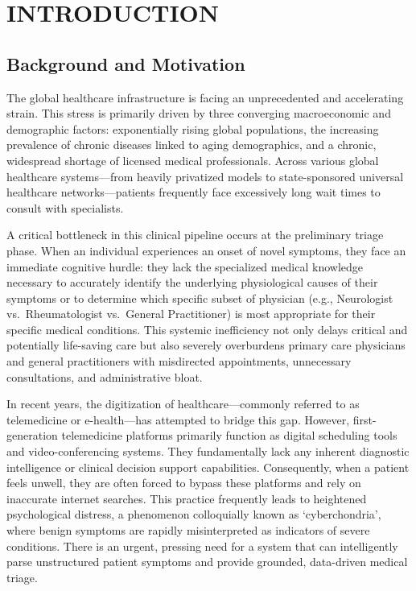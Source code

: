\chapter{INTRODUCTION}

\section{Background and Motivation}

The global healthcare infrastructure is facing an unprecedented and accelerating strain. This stress is primarily driven by three converging macroeconomic and demographic factors: exponentially rising global populations, the increasing prevalence of chronic diseases linked to aging demographics, and a chronic, widespread shortage of licensed medical professionals. Across various global healthcare systems---from heavily privatized models to state-sponsored universal healthcare networks---patients frequently face excessively long wait times to consult with specialists.

A critical bottleneck in this clinical pipeline occurs at the preliminary triage phase. When an individual experiences an onset of novel symptoms, they face an immediate cognitive hurdle: they lack the specialized medical knowledge necessary to accurately identify the underlying physiological causes of their symptoms or to determine which specific subset of physician (e.g., Neurologist vs.\ Rheumatologist vs.\ General Practitioner) is most appropriate for their specific medical conditions. This systemic inefficiency not only delays critical and potentially life-saving care but also severely overburdens primary care physicians and general practitioners with misdirected appointments, unnecessary consultations, and administrative bloat.

In recent years, the digitization of healthcare---commonly referred to as telemedicine or e-health---has attempted to bridge this gap. However, first-generation telemedicine platforms primarily function as digital scheduling tools and video-conferencing systems. They fundamentally lack any inherent diagnostic intelligence or clinical decision support capabilities. Consequently, when a patient feels unwell, they are often forced to bypass these platforms and rely on inaccurate internet searches. This practice frequently leads to heightened psychological distress, a phenomenon colloquially known as `cyberchondria', where benign symptoms are rapidly misinterpreted as indicators of severe conditions. There is an urgent, pressing need for a system that can intelligently parse unstructured patient symptoms and provide grounded, data-driven medical triage.

